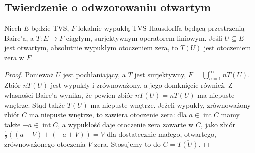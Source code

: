 \subsection{Twierdzenie o odwzorowaniu otwartym}

\begin{lemat}\label{lem:baire-open11}
Niech $E$ będzie TVS, $F$ lokalnie wypukłą TVS Hausdorffa
będącą przestrzenią Baire'a, a $T:E\to F$ ciągłym,
surjektywnym operatorem liniowym. Jeśli $U\subseteq E$
jest otwartym, absolutnie wypukłym otoczeniem zera, to
$\overline{T(U)}$ jest otoczeniem zera w $F$.
\end{lemat}
\begin{proof}
Ponieważ $U$ jest pochłaniający, a $T$ jest surjektywny,
$F=\bigcup_{n=1}^\infty nT(U)$. Zbiór $nT(U)$ jest
wypukły i zrównoważony, a jego domknięcie również.
Z własności Baire'a wynika, że pewien zbiór
$\overline{nT(U)}=n\overline{T(U)}$ ma niepuste wnętrze.
Stąd także $\overline{T(U)}$ ma niepuste wnętrze.
Jeżeli wypukły, zrównoważony zbiór $C$ ma niepuste wnętrze,
to zawiera otoczenie zera: dla $a\in\operatorname{int}C$
mamy także $-a\in\operatorname{int}C$, a wypukłość
daje otoczenie zera zawarte w $C$, jako zbiór
$\tfrac12((a+V)+(-a+V))=V$ dla dostatecznie małego,
otwartego, zrównoważonego otoczenia $V$ zera.
Stosujemy to do $C=\overline{T(U)}$.
\end{proof}

